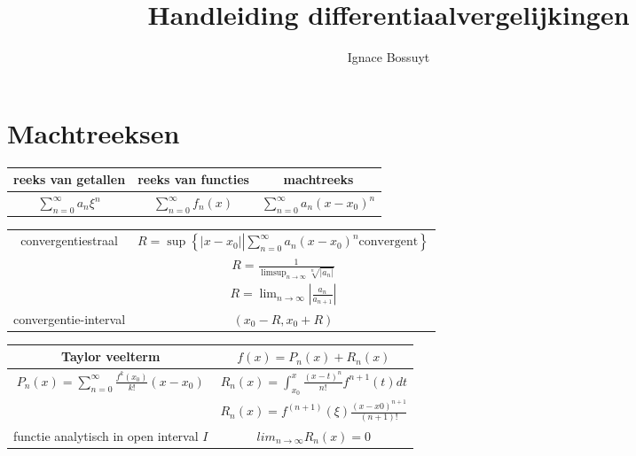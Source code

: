 \documentclass[10pt,a4paper]{article}
\author{Ignace Bossuyt}
\title{Handleiding differentiaalvergelijkingen}
\begin{document}
\section{Machtreeksen}
\begin{center}
\centering
{\tabulinesep=1.5mm
\begin{tabu}{|c|c|c|} 
\hline
reeks van getallen & reeks van functies & machtreeks \\ \hline
$\sum_{n=0}^{\infty} a_n \xi^n$ & $\sum_{n=0}^{\infty} f_n(x)$ & $\sum_{n=0} ^{\infty} a_n (x-x_0)^n$ \\ \hline
\end{tabu}}
\end{center}

\begin{center}
	\centering
	{\tabulinesep=1.5mm
		\begin{tabu}{|c|c|} 
			\hline
convergentiestraal & $R = \sup \left \{  |x-x_0| \left \lvert \sum_{n=0}^{\infty} a_n(x-x_0)^n \text{convergent} \right. \right \}$ \\ 
	& $R= \frac{1}{\limsup_{n \to \infty} \sqrt[n]{|a_n|}}$ \\
	& $R = \lim_{n \to \infty} \left \lvert \frac{a_n}{a_{n+1}} \right \rvert $ \\ \hline

convergentie-interval & $(x_0-R, x_0+R)$ \\ \hline
	\end{tabu}}
\end{center}

\begin{center}
	\centering
	{\tabulinesep=1.5mm
		\begin{tabu}{|c|c|} 
			\hline
Taylor veelterm & $f(x) = P_n(x) + R_n(x)$ \\ \hline
$P_n(x) = \sum_{n=0}^{\infty}\frac{f^k(x_0)}{k!}(x-x_0)$ & $R_n(x) = \int_{x_0}^{x} \frac{(x-t)^n}{n!}f^{n+1} (t)dt$ \\ 
	& $R_n(x) = f^{(n+1)} (\xi) \frac{(x-x0)^{n+1}}{(n+1)!}$ \\ \hline
	
functie analytisch in open interval $I$ & $lim_{n \to \infty} R_n(x)= 0$ \\ \hline
	\end{tabu}}
\end{center}
\end{document}
